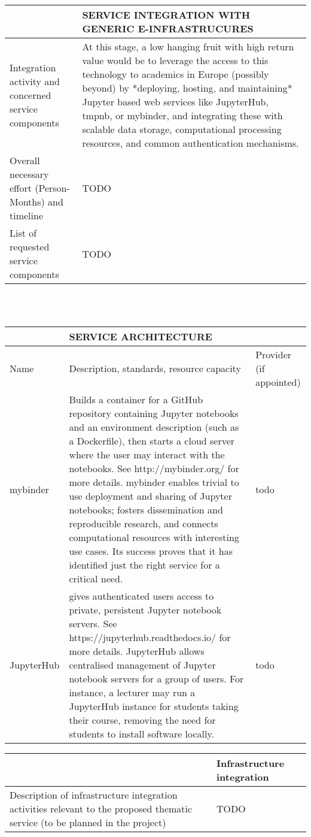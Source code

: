 \begin{tabular}{|p{7cm}|p{7cm}|}
&SERVICE INTEGRATION WITH GENERIC E-INFRASTRUCURES
\\\hline
Integration activity and concerned service components&At this stage, a low hanging fruit with high return value would be to
leverage the access to this technology to academics in Europe
(possibly beyond) by *deploying, hosting, and maintaining* Jupyter
based web services like JupyterHub, tmpnb, or mybinder, and integrating these
with scalable data storage, computational processing resources, and common
authentication mechanisms.
\\\hline
Overall necessary effort (Person-Months) and timeline&TODO
\\\hline
List of requested service components&TODO
\\\hline
\end{tabular}
\\\\
\begin{tabular}{|p{2cm}|p{8cm}|p{4cm}|}
&SERVICE ARCHITECTURE&
\\\hline
Name&Description, standards, resource capacity&Provider (if appointed)
\\\hline
mybinder&Builds a container for a GitHub repository containing
Jupyter notebooks and an environment description (such as a
Dockerfile), then starts a cloud server where the user may interact
with the notebooks. See http://mybinder.org/ for more details.
mybinder enables trivial to use deployment and sharing of
Jupyter notebooks; fosters dissemination and reproducible research,
and connects computational resources with interesting use cases.
Its success proves that it has identified just the right service for
a critical need.&todo
\\\hline
JupyterHub&gives authenticated users access to private, persistent Jupyter
notebook servers. See https://jupyterhub.readthedocs.io/ for more details.
JupyterHub allows centralised management of Jupyter notebook servers
for a group of users. For instance, a lecturer may run a JupyterHub instance for
students taking their course, removing the need for students to install software
locally.&todo
\\\hline
\end{tabular}

\begin{tabular}{|p{7cm}|l|}
  &Infrastructure integration
  \\\hline
  Description of infrastructure integration activities relevant to the proposed thematic service (to be planned in the project)&TODO
  \\\hline
\end{tabular}


